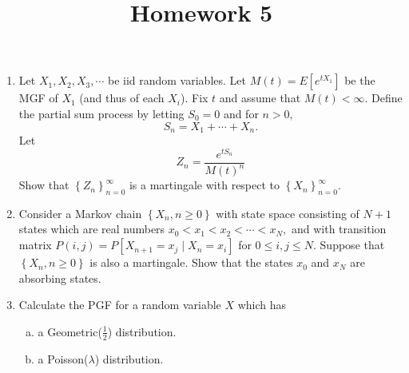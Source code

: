 \documentclass{article}
\begin{document}
\title{Homework 5}
\maketitle
\thispagestyle{fancy}

\begin{enumerate}
	\item Let $X_1, X_2, X_3, \cdots$ be iid random variables. Let $M(t)=E\left[ e^{tX_1} \right]$ be the MGF of $X_1$ (and thus of each $X_i$). Fix $t$ and assume that $M(t)<\infty.$ Define the partial sum process by letting $S_0=0$ and for $n>0,$
		\[S_n=X_1+\cdots+X_n.\]
		Let
		\[Z_n=\frac{e^{tS_n}}{M(t)^n}\]
		Show that $\left\{ Z_n \right\}_{n=0}^\infty$ is a martingale with respect to $\left\{ X_n \right\}_{n=0}^\infty.$

	\item Consider a Markov chain $\left\{ X_n, n\ge 0 \right\}$ with state space consisting of $N+1$ states which are real numbers $x_0<x_1<x_2<\cdots<x_N,$ and with transition matrix $P(i, j)=P[X_{n+1}=x_j\mid X_n=x_i]$ for $0\le i, j\le N.$ Suppose that $\left\{ X_n, n\ge0 \right\}$ is also a martingale. Show that the states $x_0$ and $x_N$ are absorbing states.

	\item Calculate the PGF for a random variable $X$ which has
		\begin{enumerate}[(a)]
			\item a Geometric($\frac{1}{2}$) distribution.

			\item a Poisson($\lambda$) distribution.
				
		\end{enumerate}


\end{enumerate}
\end{document}
